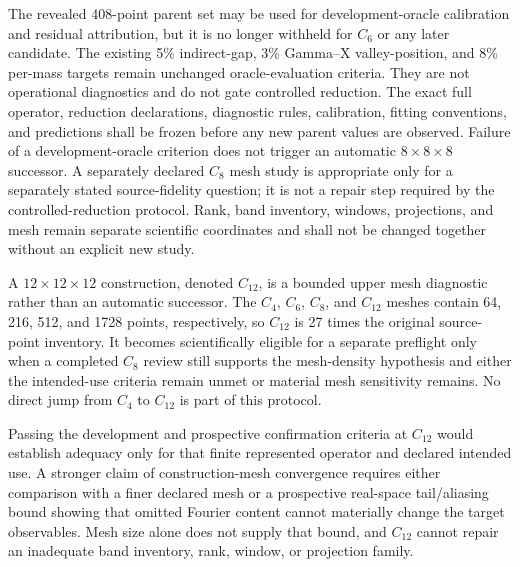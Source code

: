 \documentclass[11pt]{article}
\begin{document}
The revealed 408-point parent set may be used for development-oracle calibration and
residual attribution, but it is no longer withheld for $C_6$ or any later candidate.
The existing 5\% indirect-gap, 3\% Gamma--X valley-position, and 8\% per-mass targets
remain unchanged oracle-evaluation criteria.  They are not operational diagnostics and
do not gate controlled reduction.  The exact full operator, reduction declarations,
diagnostic rules, calibration, fitting conventions, and predictions shall be frozen
before any new parent values are observed.  Failure of a development-oracle criterion
does not trigger an automatic $8\times8\times8$ successor.  A separately declared
$C_8$ mesh study is appropriate only for a separately stated source-fidelity question;
it is not a repair step required by the controlled-reduction protocol.  Rank, band
inventory, windows, projections, and mesh remain separate scientific coordinates and
shall not be changed together without an explicit new study.

A $12\times12\times12$ construction, denoted $C_{12}$, is a bounded upper mesh
diagnostic rather than an automatic successor.  The $C_4$, $C_6$, $C_8$, and $C_{12}$
meshes contain 64, 216, 512, and 1728 points, respectively, so $C_{12}$ is 27 times the
original source-point inventory.  It becomes scientifically eligible for a separate
preflight only when a completed $C_8$ review still supports the mesh-density hypothesis
and either the intended-use criteria remain unmet or material mesh sensitivity remains.
No direct jump from $C_4$ to $C_{12}$ is part of this protocol.

Passing the development and prospective confirmation criteria at $C_{12}$ would
establish adequacy only for that finite represented operator and declared intended use.
A stronger claim of construction-mesh convergence requires either comparison with a
finer declared mesh or a prospective real-space tail/aliasing bound showing that omitted
Fourier content cannot materially change the target observables.  Mesh size alone does
not supply that bound, and $C_{12}$ cannot repair an inadequate band inventory, rank,
window, or projection family.
\end{document}
